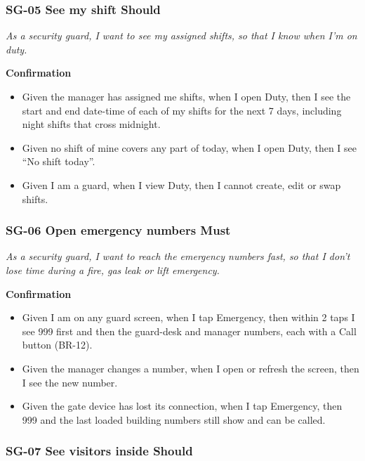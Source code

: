 \documentclass[11pt,a4paper]{report}
\begin{document}
\subsubsection*{SG-05 \textperiodcentered{} See my shift \textperiodcentered{} Should}

\emph{As a security guard, I want to see my assigned shifts, so that I know when I'm on duty.}

\medskip\noindent\textbf{Confirmation}\par

\begin{itemize}
  \item Given the manager has assigned me shifts, when I open Duty, then I see the start and end date-time of each of my shifts for the next 7 days, including night shifts that cross midnight.
  \item Given no shift of mine covers any part of today, when I open Duty, then I see ``No shift today''.
  \item Given I am a guard, when I view Duty, then I cannot create, edit or swap shifts.
\end{itemize}

\subsubsection*{SG-06 \textperiodcentered{} Open emergency numbers \textperiodcentered{} Must}

\emph{As a security guard, I want to reach the emergency numbers fast, so that I don't lose time during a fire, gas leak or lift emergency.}

\medskip\noindent\textbf{Confirmation}\par

\begin{itemize}
  \item Given I am on any guard screen, when I tap Emergency, then within 2 taps I see 999 first and then the guard-desk and manager numbers, each with a Call button (BR-12).
  \item Given the manager changes a number, when I open or refresh the screen, then I see the new number.
  \item Given the gate device has lost its connection, when I tap Emergency, then 999 and the last loaded building numbers still show and can be called.
\end{itemize}

\subsubsection*{SG-07 \textperiodcentered{} See visitors inside \textperiodcentered{} Should}
\end{document}
